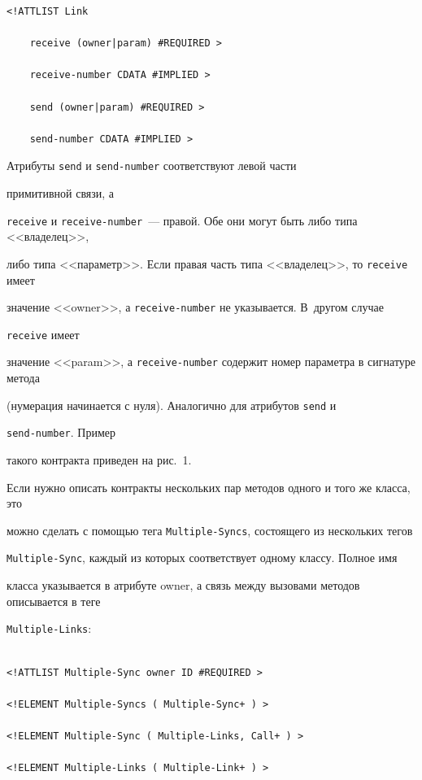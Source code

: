 {\begin{verbatim}
<!ATTLIST Link

    receive (owner|param) #REQUIRED >

    receive-number CDATA #IMPLIED >

    send (owner|param) #REQUIRED >

    send-number CDATA #IMPLIED >

\end{verbatim}



  Атрибуты \verb"send" и \verb"send-number" соответствуют левой части

  примитивной связи, а

\verb"receive" и \verb"receive-number"~--- правой. Обе они могут быть либо типа <<владелец>>,

либо типа <<параметр>>. Если правая часть типа <<владелец>>, то \verb"receive" имеет

значение <<{\sf owner}>>, а \verb"receive-number" не указывается. В~другом случае

\verb"receive" имеет

значение <<{\sf param}>>, а \verb"receive-number" содержит номер параметра в сигнатуре метода

(нумерация начинается с нуля). Аналогично для атрибутов \verb"send" и

\verb"send-number". Пример

такого контракта приведен на рис.~1.



   Если нужно описать контракты нескольких пар методов одного и того же класса, это

можно сделать с помощью тега \verb"Multiple-Syncs", состоящего из нескольких тегов

\verb"Multiple-Sync", каждый из которых соответствует одному классу. Полное имя

класса указывается в атрибуте {\sf owner}, а связь между вызовами методов описывается в теге

\verb"Multiple-Links":

  \begin{verbatim}

<!ATTLIST Multiple-Sync owner ID #REQUIRED >

<!ELEMENT Multiple-Syncs ( Multiple-Sync+ ) >

<!ELEMENT Multiple-Sync ( Multiple-Links, Call+ ) >

<!ELEMENT Multiple-Links ( Multiple-Link+ ) >

\end{verbatim}



}
